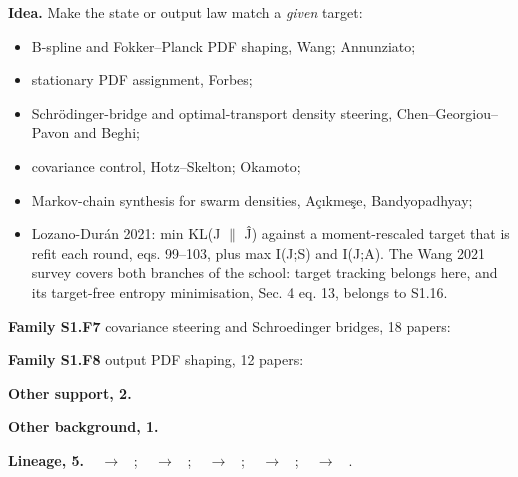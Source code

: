 \documentclass[10pt]{article}
\newcommand{\memb}[1]{\par\smallskip\textbf{#1}\quad}
\begin{document}
\textbf{Idea.} Make the state or output law match a \emph{given} target:
\begin{itemize}[nosep,leftmargin=1.2em]
\item B-spline and Fokker--Planck PDF shaping, Wang; Annunziato;
\item stationary PDF assignment, Forbes;
\item Schr\"odinger-bridge and optimal-transport density steering, Chen--Georgiou--Pavon and Beghi;
\item covariance control, Hotz--Skelton; Okamoto;
\item Markov-chain synthesis for swarm densities, A\c{c}\i{}kme\c{s}e, Bandyopadhyay;
\item Lozano-Dur\'an 2021: min KL(J \ensuremath{\|} \^J) against a moment-rescaled target that is refit each round, eqs. 99--103, plus max I(J;S) and I(J;A). The Wang 2021 survey covers both branches of the school: target tracking belongs here, and its target-free entropy minimisation, Sec. 4 eq. 13, belongs to S1.16.
\end{itemize}


\memb{Family S1.F7} covariance steering and Schroedinger bridges, 18 papers: {\footnotesize \citetext{\citealp{Hotz-covariance87}; \citealp{Beghi-relative96}; \citealp{Chen-fast15}; \citealp{Chen-optimal16a}; \citealp{Okamoto-optimal18}; \citealp{Chen-optimal21}; \citealp{Chen-stochastic21}; \citealp{Dai-stochastic91}; \citealp{Pavon-free91}; \citealp{Grigoriadis-minimum97}; \citealp{Chen-steering15}; \citealp{Chen-optimal16b}; \citealp{Chen-relation15}; \citealp{Chen-optimal17}; \citealp{Goldshtein-finite17}; \citealp{Bakolas-finite18}; \citealp{Chen-optimal18}; \citealp{Liu-optimal25}}}

\memb{Family S1.F8} output PDF shaping, 12 papers: {\footnotesize \citetext{\citealp{Wang-robust99}; \citealp{Wang-bounded00}; \citealp{Forbes-control04}; \citealp{Annunziato-optimal10}; \citealp{Zhu-feedback11}; \citealp{Ren-introductory19}; \citealp{Wang-survey21}; \citealp{Yue-recent03}; \citealp{Forbes-control05}; \citealp{Guo-optimal08}; \citealp{Brockett-notes12}; \citealp{Annunziato-fokker18}}}

\memb{Other support, 2.} \citetext{\citealp{Acikmese-markov12}; \citealp{Bandyopadhyay-probabilistic17}}

\memb{Other background, 1.} {\footnotesize \citetext{\citealp{Demir-decentralized15}}}

\memb{Lineage, 5.} {\footnotesize \citeauthor{Hotz-covariance87}~\citeyear{Hotz-covariance87} $\to$ \citeauthor{Okamoto-optimal18}~\citeyear{Okamoto-optimal18}; \citeauthor{Dai-stochastic91}~\citeyear{Dai-stochastic91} $\to$ \citeauthor{Chen-stochastic21}~\citeyear{Chen-stochastic21}; \citeauthor{Wang-robust99}~\citeyear{Wang-robust99} $\to$ \citeauthor{Wang-minimum02}~\citeyear{Wang-minimum02}; \citeauthor{Wang-robust99}~\citeyear{Wang-robust99} $\to$ \citeauthor{Wang-survey21}~\citeyear{Wang-survey21}; \citeauthor{Yue-minimum03}~\citeyear{Yue-minimum03} $\to$ \citeauthor{Ren-introductory19}~\citeyear{Ren-introductory19}.}
\end{document}
